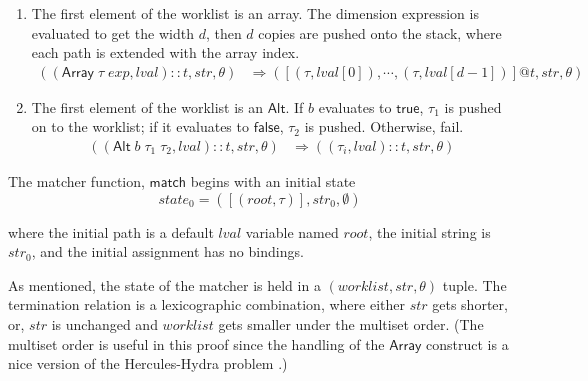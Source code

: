 \documentclass[a4paper,UKenglish,cleveref, autoref, thm-restate]{lipics-v2021}
\newcommand{\konst}[1]{\ensuremath{\mathsf{#1}}}
\newcommand{\lval}{\ensuremath{\mathit{lval}}}
\begin{document}
\begin{definition}
\begin{enumerate}
\item The first element of the worklist is an array. The dimension
  expression is evaluated to get the width $d$, then $d$ copies are
  pushed onto the stack, where each path is extended with the array
  index.
%
\begin{align*}
((\konst{Array}\; \tau \; \mathit{exp},\lval)::t, \mathit{str}, \theta)
   &\Rightarrow
  ([(\tau,\lval[0]), \cdots , (\tau,\lval[d-1])] @ t,\mathit{str}, \theta)
\end{align*}

\item The first element of the worklist is an \konst{Alt}. If $b$ evaluates to \konst{true},
  $\tau_1$ is pushed on to the worklist; if it evaluates to \konst{false}, $\tau_2$ is pushed.
  Otherwise, fail.
%
\begin{align*}
((\konst{Alt}\; b\;\tau_1\;\tau_2, \lval)::t, \mathit{str}, \theta)
   &\Rightarrow
  ((\tau_i,\lval)::t,\mathit{str}, \theta)
\end{align*}

\end{enumerate}

\noindent The matcher function, \konst{match} begins with an initial state
%
\[
  \mathit{state}_0 = ([(\mathit{root},\tau)],\mathit{str}_0,\emptyset)
\]

where the initial path is a default \lval{} variable named
$\mathit{root}$, the initial string is $\mathit{str}_0$, and the
initial assignment has no bindings.

\end{definition}

\begin{theorem}
As mentioned, the state of the matcher is held in a
$(\mathit{worklist},\mathit{str}, \theta)$ tuple. The termination
relation is a lexicographic combination, where either $\mathit{str}$
gets shorter, or, $\mathit{str}$ is unchanged and $\mathit{worklist}$
gets smaller under the multiset order. (The multiset order is useful
in this proof since the handling of the \konst{Array} construct is a
nice version of the Hercules-Hydra problem \cite{dershowitz:manna}.)
\end{theorem}
\end{document}
